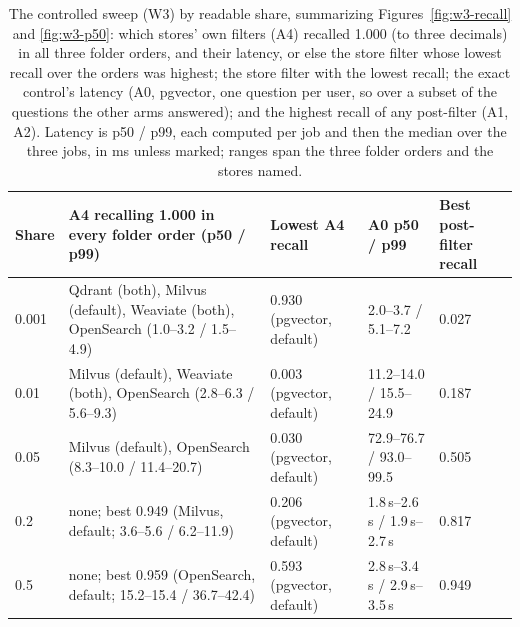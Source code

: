 \begin{table}[t]
\caption{The controlled sweep (W3) by readable share, summarizing Figures~\ref{fig:w3-recall} and \ref{fig:w3-p50}: which stores' own filters (A4) recalled 1.000 (to three decimals) in all three folder orders, and their latency, or else the store filter whose lowest recall over the orders was highest; the store filter with the lowest recall; the exact control's latency (A0, pgvector, one question per user, so over a subset of the questions the other arms answered); and the highest recall of any post-filter (A1, A2). Latency is p50 / p99, each computed per job and then the median over the three jobs, in ms unless marked; ranges span the three folder orders and the stores named.}
\label{tab:regimes}
\footnotesize
\begin{tabularx}{\textwidth}{@{}l>{\raggedright\arraybackslash}Xlll@{}}
\toprule
Share & A4 recalling 1.000 in every folder order (p50 / p99) & Lowest A4 recall & A0 p50 / p99 & Best post-filter recall \\
\midrule
0.001 & Qdrant (both), Milvus (default), Weaviate (both), OpenSearch (1.0--3.2 / 1.5--4.9) & 0.930 (pgvector, default) & 2.0--3.7 / 5.1--7.2 & 0.027 \\
0.01 & Milvus (default), Weaviate (both), OpenSearch (2.8--6.3 / 5.6--9.3) & 0.003 (pgvector, default) & 11.2--14.0 / 15.5--24.9 & 0.187 \\
0.05 & Milvus (default), OpenSearch (8.3--10.0 / 11.4--20.7) & 0.030 (pgvector, default) & 72.9--76.7 / 93.0--99.5 & 0.505 \\
0.2 & none; best 0.949 (Milvus, default; 3.6--5.6 / 6.2--11.9) & 0.206 (pgvector, default) & 1.8\,s--2.6\,s / 1.9\,s--2.7\,s & 0.817 \\
0.5 & none; best 0.959 (OpenSearch, default; 15.2--15.4 / 36.7--42.4) & 0.593 (pgvector, default) & 2.8\,s--3.4\,s / 2.9\,s--3.5\,s & 0.949 \\
\bottomrule
\end{tabularx}
\end{table}
